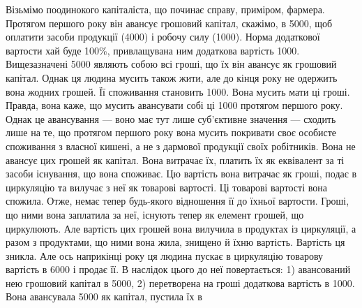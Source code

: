 \vtyagnut{}
Візьмімо поодинокого капіталіста, що починає справу, приміром,
фармера. Протягом першого року він авансує грошовий капітал, скажімо,
в 5000, щоб оплатити засоби продукції (4000) і робочу
силу (1000). Норма додаткової вартости хай буде 100\%, привлащувана
ним додаткова вартість \deq{} 1000. Вищезазначені 5000 являють собою всі гроші, що їх він авансує як грошовий капітал.
Однак ця людина мусить також жити, але до кінця року не одержить
вона жодних грошей. Її споживання становить 1000. Вона мусить
мати ці гроші. Правда, вона каже, що мусить авансувати собі ці 1000
протягом першого року. Однак це авансування — воно має тут лише
суб’єктивне значення — сходить лише на те, що протягом першого року
вона мусить покривати своє особисте споживання з власної кишені, а не
з дармової продукції своїх робітників. Вона не авансує цих грошей як
капітал. Вона витрачає їх, платить їх як еквівалент за ті засоби існування,
що вона споживає. Цю вартість вона витрачає як гроші, подає в
циркуляцію та вилучає з неї як товарові вартості. Ці товарові вартості
вона спожила. Отже, немає тепер будь-якого відношення її до їхньої
вартости. Гроші, що ними вона заплатила за неї, існують тепер як елемент
грошей, що циркулюють. Але вартість цих грошей вона вилучила
в продуктах із циркуляції, а разом з продуктами, що ними вона жила,
знищено й їхню вартість. Вартість ця зникла. Але ось наприкінці року
ця людина пускає в циркуляцію товарову вартість в 6000 і продає її.
В наслідок цього до неї повертається: 1) авансований нею грошовий
капітал в 5000, 2) перетворена на гроші додаткова вартість в
1000. Вона авансувала 5000 як капітал, пустила їх в
\parbreak{}  %

